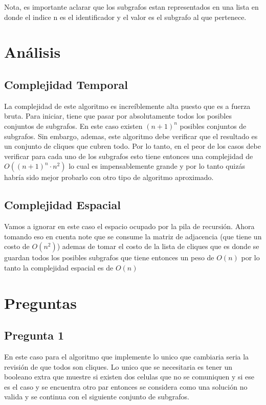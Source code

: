 \documentclass[12pt]{exam}
\begin{document}
Nota, es importante aclarar que los subgrafos estan representados en una lista en donde el indice n es el identificador y el valor es el subgrafo al que pertenece.

\section{Análisis}
\subsection{Complejidad Temporal}

La complejidad de este algoritmo es increíblemente alta puesto que es a fuerza bruta. Para iniciar, tiene que pasar por absolutamente todos los posibles conjuntos de subgrafos. En este caso existen $\left( n + 1 \right)^{n}$ posibles conjuntos de subgrafos. Sin embargo, ademas, este algoritmo debe verificar que el resultado es un conjunto de cliques que cubren todo. Por lo tanto, en el peor de los casos debe verificar para cada uno de los subgrafos esto tiene entonces una complejidad de $O\left( \left( n + 1 \right) ^{n}\cdot n^2 \right) $ lo cual es impensablemente grande y por lo tanto quizás habría sido mejor probarlo con otro tipo de algoritmo aproximado.

\subsection{Complejidad Espacial}

Vamos a ignorar en este caso el espacio ocupado por la pila de recursión. Ahora tomando eso en cuenta note que se consume la matriz de adjacencia (que tiene un costo de $O\left( n^2 \right) $) ademas de tomar el costo de la lista de cliques que es donde se guardan todos los posibles subgrafos que tiene entonces un peso de $O\left( n \right) $ por lo tanto la complejidad espacial es de $O\left( n \right) $

\section{Preguntas}
\subsection{Pregunta 1}

En este caso para el algoritmo que implemente lo unico que cambiaria seria la revisión de que todos son cliques. Lo unico que se necesitaria es tener un booleano extra que muestre si existen dos celulas que no se comuniquen y si ese es el caso y se encuentra otro par entonces se considera como una solución no valida y se continua con el siguiente conjunto de subgrafos.
\end{document}

